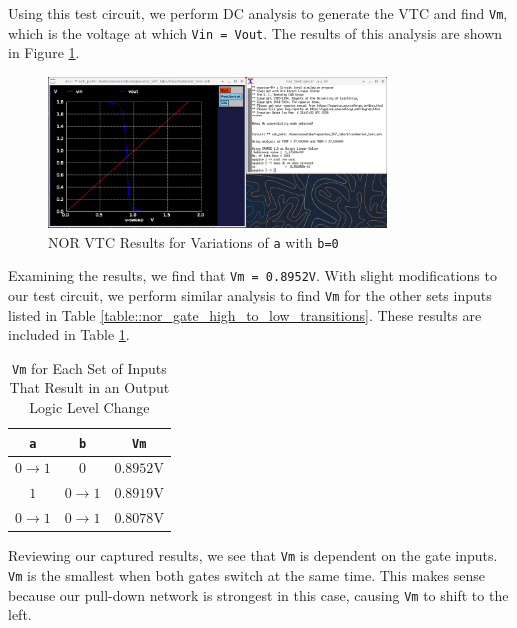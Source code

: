 \documentclass[fleqn]{article}
\begin{document}
	\noindent Using this test circuit, we perform DC analysis to generate the VTC and find \texttt{Vm}, which is the voltage at which \texttt{Vin = Vout}. The results of this analysis are shown in Figure \ref{fig::nor_vtc_sweep_va}.
	
	\begin{figure}[H]
		\centerline{\includegraphics[width=0.8\textwidth]{nor_vtc_sweep_va.png}}
		\caption{NOR VTC Results for Variations of \texttt{a} with \texttt{b=0}}
		\label{fig::nor_vtc_sweep_va}
	\end{figure}
	
	Examining the results, we find that \texttt{Vm = 0.8952V}. With slight modifications to our test circuit, we perform similar analysis to find \texttt{Vm} for the other sets inputs listed in Table \ref{table::nor_gate_high_to_low_transitions}. These results are included in Table \ref{table::nor_gate_vm}.
	
	\begin{table}[H]
	\begin{center}
	\caption{\texttt{Vm} for Each Set of Inputs That Result in an Output Logic Level Change}
	\label{table::nor_gate_vm}
	\begin{tabular}{| c | c | c |}
		\hline
		\texttt{a} & \texttt{b} & \texttt{Vm}\\
		\hline	
		$0 \rightarrow 1$ & $0$ & $0.8952 \text{V}$\\
		\hline	
		$1$ & $0 \rightarrow 1$ & $0.8919 \text{V}$\\
		\hline	
		$0 \rightarrow 1$ & $0 \rightarrow 1$ & $0.8078 \text{V}$\\
		\hline
	\end{tabular}
	\end{center}
	\end{table}
	
	\noindent Reviewing our captured results, we see that \texttt{Vm} is dependent on the gate inputs. \texttt{Vm} is the smallest when both gates switch at the same time. This makes sense because our pull-down network is strongest in this case, causing \texttt{Vm} to shift to the left.
	
\end{document}
